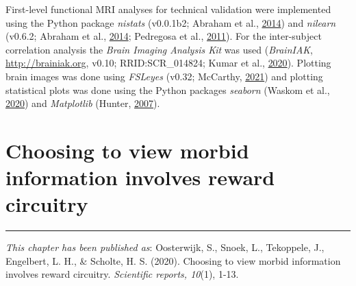 \documentclass[12pt,american,a4paper,oneside,]{memoir} %
\begin{document}
First-level functional MRI analyses for technical validation were implemented using the Python package \emph{nistats} (v0.0.1b2; Abraham et al., \protect\hyperlink{ref-Abraham2014-ef}{2014}) and \emph{nilearn} (v0.6.2; Abraham et al., \protect\hyperlink{ref-Abraham2014-ef}{2014}; Pedregosa et al., \protect\hyperlink{ref-pedregosa2011scikit}{2011}). For the inter-subject correlation analysis the \emph{Brain Imaging Analysis Kit} was used (\emph{BrainIAK}, \url{http://brainiak.org}, v0.10; RRID:SCR\_014824; Kumar et al., \protect\hyperlink{ref-Kumar2020-eo}{2020}). Plotting brain images was done using \emph{FSLeyes} (v0.32; McCarthy, \protect\hyperlink{ref-McCarthy2019-yt}{2021}) and plotting statistical plots was done using the Python packages \emph{seaborn} (Waskom et al., \protect\hyperlink{ref-Waskom2020-qq}{2020}) and \emph{Matplotlib} (Hunter, \protect\hyperlink{ref-Hunter2007-at}{2007}).

\hypertarget{morbid-curiosity}{%
\chapter{Choosing to view morbid information involves reward circuitry}\label{morbid-curiosity}}


\vspace*{\fill}

\begin{center}\rule{0.5\linewidth}{0.5pt}\end{center}

\small

\noindent
\emph{This chapter has been published as}: Oosterwijk, S., Snoek, L., Tekoppele, J., Engelbert, L. H., \& Scholte, H. S. (2020). Choosing to view morbid information involves reward circuitry. \emph{Scientific reports, 10}(1), 1-13.

\newpage
\normalsize
\end{document}
